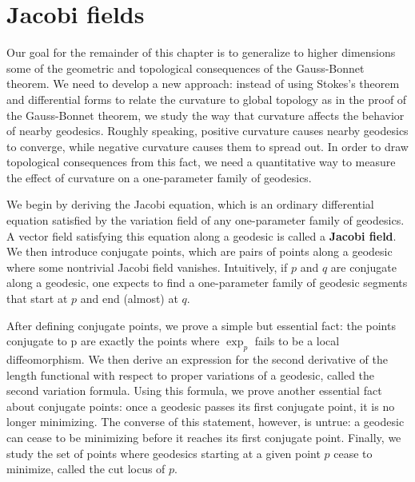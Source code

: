 \section{Jacobi fields}
Our goal for the remainder of this chapter is to generalize to higher dimensions some of the geometric and topological consequences of the Gauss-Bonnet theorem. We need to develop a new approach: instead of using Stokes's theorem and differential forms to relate the curvature to global topology as in the proof of the Gauss-Bonnet theorem, we study the way that curvature affects the behavior of nearby geodesics. Roughly speaking, positive curvature causes nearby geodesics to converge, while negative curvature causes them to spread out. In order to draw topological consequences from this fact, we need a quantitative way to measure the effect of curvature on a one-parameter family of geodesics.\par
We begin by deriving the Jacobi equation, which is an ordinary differential equation satisfied by the variation field of any one-parameter family of geodesics. A vector field satisfying this equation along a geodesic is called a \textbf{Jacobi field}. We then introduce conjugate points, which are pairs of points along a geodesic where some nontrivial Jacobi field vanishes. Intuitively, if $p$ and $q$ are conjugate along a geodesic, one expects to find a one-parameter family of geodesic segments that start at $p$ and end (almost) at $q$.\par
After defining conjugate points, we prove a simple but essential fact: the points conjugate to p are exactly the points where $\exp_p$ fails to be a local diffeomorphism. We then derive an expression for the second derivative of the length functional with respect to proper variations of a geodesic, called the second variation formula. Using this formula, we prove another essential fact about conjugate points: once a geodesic passes its first conjugate point, it is no longer minimizing. The converse of this statement, however, is untrue: a geodesic can cease to be minimizing before it reaches its first conjugate point. Finally, we study the set of points where geodesics starting at a given point $p$ cease to minimize, called the cut locus of $p$.
